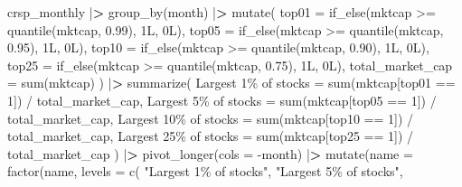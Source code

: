 \documentclass[
]{book}
\newenvironment{Shaded}{\begin{snugshade}}{\end{snugshade}}
\newcommand{\AttributeTok}[1]{\textcolor[rgb]{0.61,0.61,0.61}{#1}}
\newcommand{\DecValTok}[1]{\textcolor[rgb]{0.06,0.06,0.06}{#1}}
\newcommand{\ErrorTok}[1]{\textcolor[rgb]{0.14,0.14,0.14}{\textbf{#1}}}
\newcommand{\FloatTok}[1]{\textcolor[rgb]{0.06,0.06,0.06}{#1}}
\newcommand{\FunctionTok}[1]{\textcolor[rgb]{0,0,0}{#1}}
\newcommand{\NormalTok}[1]{#1}
\newcommand{\OtherTok}[1]{\textcolor[rgb]{0.37,0.37,0.37}{#1}}
\newcommand{\SpecialCharTok}[1]{\textcolor[rgb]{0,0,0}{#1}}
\newcommand{\StringTok}[1]{\textcolor[rgb]{0.5,0.5,0.5}{#1}}
\begin{document}
\begin{Shaded}
\begin{Highlighting}[]
\NormalTok{crsp\_monthly }\SpecialCharTok{|}\ErrorTok{\textgreater{}}
  \FunctionTok{group\_by}\NormalTok{(month) }\SpecialCharTok{|}\ErrorTok{\textgreater{}}
  \FunctionTok{mutate}\NormalTok{(}
    \AttributeTok{top01 =} \FunctionTok{if\_else}\NormalTok{(mktcap }\SpecialCharTok{\textgreater{}=} \FunctionTok{quantile}\NormalTok{(mktcap, }\FloatTok{0.99}\NormalTok{), 1L, 0L),}
    \AttributeTok{top05 =} \FunctionTok{if\_else}\NormalTok{(mktcap }\SpecialCharTok{\textgreater{}=} \FunctionTok{quantile}\NormalTok{(mktcap, }\FloatTok{0.95}\NormalTok{), 1L, 0L),}
    \AttributeTok{top10 =} \FunctionTok{if\_else}\NormalTok{(mktcap }\SpecialCharTok{\textgreater{}=} \FunctionTok{quantile}\NormalTok{(mktcap, }\FloatTok{0.90}\NormalTok{), 1L, 0L),}
    \AttributeTok{top25 =} \FunctionTok{if\_else}\NormalTok{(mktcap }\SpecialCharTok{\textgreater{}=} \FunctionTok{quantile}\NormalTok{(mktcap, }\FloatTok{0.75}\NormalTok{), 1L, 0L),}
    \AttributeTok{total\_market\_cap =} \FunctionTok{sum}\NormalTok{(mktcap)}
\NormalTok{  ) }\SpecialCharTok{|}\ErrorTok{\textgreater{}}
  \FunctionTok{summarize}\NormalTok{(}
    \StringTok{\textasciigrave{}}\AttributeTok{Largest 1\% of stocks}\StringTok{\textasciigrave{}} \OtherTok{=} \FunctionTok{sum}\NormalTok{(mktcap[top01 }\SpecialCharTok{==} \DecValTok{1}\NormalTok{]) }\SpecialCharTok{/}\NormalTok{ total\_market\_cap,}
    \StringTok{\textasciigrave{}}\AttributeTok{Largest 5\% of stocks}\StringTok{\textasciigrave{}} \OtherTok{=} \FunctionTok{sum}\NormalTok{(mktcap[top05 }\SpecialCharTok{==} \DecValTok{1}\NormalTok{]) }\SpecialCharTok{/}\NormalTok{ total\_market\_cap,}
    \StringTok{\textasciigrave{}}\AttributeTok{Largest 10\% of stocks}\StringTok{\textasciigrave{}} \OtherTok{=} \FunctionTok{sum}\NormalTok{(mktcap[top10 }\SpecialCharTok{==} \DecValTok{1}\NormalTok{]) }\SpecialCharTok{/}\NormalTok{ total\_market\_cap,}
    \StringTok{\textasciigrave{}}\AttributeTok{Largest 25\% of stocks}\StringTok{\textasciigrave{}} \OtherTok{=} \FunctionTok{sum}\NormalTok{(mktcap[top25 }\SpecialCharTok{==} \DecValTok{1}\NormalTok{]) }\SpecialCharTok{/}\NormalTok{ total\_market\_cap}
\NormalTok{  ) }\SpecialCharTok{|}\ErrorTok{\textgreater{}}
  \FunctionTok{pivot\_longer}\NormalTok{(}\AttributeTok{cols =} \SpecialCharTok{{-}}\NormalTok{month) }\SpecialCharTok{|}\ErrorTok{\textgreater{}}
  \FunctionTok{mutate}\NormalTok{(}\AttributeTok{name =} \FunctionTok{factor}\NormalTok{(name, }\AttributeTok{levels =} \FunctionTok{c}\NormalTok{(}
    \StringTok{"Largest 1\% of stocks"}\NormalTok{, }\StringTok{"Largest 5\% of stocks"}\NormalTok{,}

\end{Highlighting}
\end{Shaded}
\end{document}
